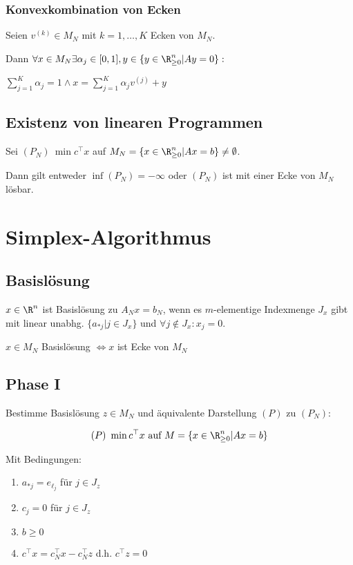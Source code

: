 \subsubsection*{Konvexkombination von Ecken}

Seien \( v^{(k)} \in M_N \) mit \(k=1,\dots,K\) Ecken von \(M_N\).

Dann \( \forall x \in M_N \exists \alpha_j \in [0,1], y \in \{ y \in \R_{\geq 0}^n | Ay = 0 \} :\)

\( \sum_{j=1}^K \alpha_j = 1 \land x = \sum_{j=1}^K \alpha_j v^{(j)} + y \)

\subsection*{Existenz von linearen Programmen}

Sei \( (P_N) \ \min c^\top x \) auf \( M_N = \{ x \in \R_{\geq 0}^n | Ax = b \} \neq \emptyset\).

Dann gilt entweder \(\inf (P_N) = -\infty\) oder \((P_N)\) ist mit einer Ecke von \(M_N\) lösbar.

\section*{Simplex-Algorithmus}

\subsection*{Basislösung}

\(x \in \R^n\) ist Basislösung zu \(A_N x = b_N\), wenn es \(m\)-elementige Indexmenge \(J_x\) gibt mit linear unabhg. \(\{a_{*j} | j \in J_x\}\) und \(\forall j \notin J_x : x_j = 0\).

\spacing

\(x \in M_N\) Basislösung \(\iff x\) ist Ecke von \(M_N\)

\subsection*{Phase I}

Bestimme Basislösung \(z \in M_N\) und äquivalente Darstellung \((P)\) zu \((P_N)\):

\vspace*{-2mm}
\[ (P) \ \min c^\top x \text{ auf } M = \{ x \in \R_{\geq 0}^n | Ax=b \} \]

Mit Bedingungen:

\begin{enumerate}[label=(E\arabic*)]
	\item \(a_{*j} = e_{\ell_j}\) für \(j \in J_z\)
	\item \(c_j = 0\) für \(j \in J_z\)
	\item \(b \geq 0\)
	\item \(c^\top x = c_N^\top x - c_N^\top z\) d.h. \(c^\top z = 0\)
\end{enumerate}

